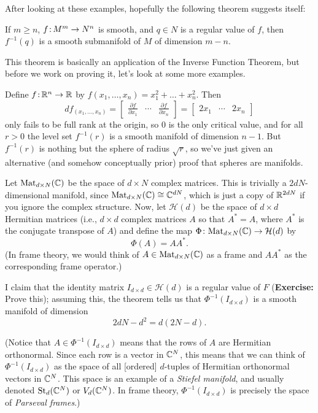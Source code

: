 	After looking at these examples, hopefully the following theorem suggests itself:
	
	\begin{theorem}\label{thm:level set theorem}
		If $m \geq n$, $f \colon\thinspace\!\! M^m \to N^n$ is smooth, and $q \in N$ is a regular value of $f$, then $f^{-1}(q)$ is a smooth submanifold of $M$ of dimension $m-n$.
	\end{theorem}
	
	This theorem is basically an application of the Inverse Function Theorem, but before we work on proving it, let's look at some more examples.
	
	\begin{example}
		Define $f \colon\thinspace\!\! \mathbb{R}^n \to \mathbb{R}$ by $f(x_1,\dots , x_n) = x_1^2 + \dots + x_n^2$. Then
		\[
			df_{(x_1, \dots , x_n)}= \begin{bmatrix} \frac{\partial f}{\partial x_1} & \cdots & \frac{\partial f}{\partial x_n} \end{bmatrix} = \begin{bmatrix} 2x_1 & \cdots & 2x_n \end{bmatrix}
		\]
		only fails to be full rank at the origin, so 0 is the only critical value, and for all $r > 0$ the level set $f^{-1}(r)$ is a smooth manifold of dimension $n-1$. But $f^{-1}(r)$ is nothing but the sphere of radius $\sqrt{r}$, so we've just given an alternative (and somehow conceptually prior) proof that spheres are manifolds.
	\end{example}
	
	\begin{example}
		Let $\operatorname{Mat}_{d \times N}(\mathbb{C})$ be the space of $d \times N$ complex matrices. This is trivially a $2dN$-dimensional manifold, since $\operatorname{Mat}_{d \times N} (\mathbb{C}) \cong \mathbb{C}^{dN}$, which is just a copy of $\mathbb{R}^{2dN}$ if you ignore the complex structure. Now, let $\mathcal{H}(d)$ be the space of $d \times d$ Hermitian matrices (i.e., $d \times d$ complex matrices $A$ so that $A^\ast = A$, where $A^\ast$ is the conjugate transpose of $A$) and define the map $\Phi\colon\thinspace\!\! \operatorname{Mat}_{d \times N}(\mathbb{C}) \to \mathcal{H}(d)$ by
		\[
			\Phi(A) = A A^\ast.
		\]
		(In frame theory, we would think of $A \in \operatorname{Mat}_{d \times N}(\mathbb{C})$ as a frame and $A A^\ast$ as the corresponding frame operator.)
		
		I claim that the identity matrix $I_{d \times d} \in \mathcal{H}(d)$ is a regular value of $F$ (\textbf{Exercise:} Prove this); assuming this, the theorem tells us that $\Phi^{-1}(I_{d \times d})$ is a smooth manifold of dimension
		\[
			2dN - d^2 = d(2N-d).
		\]
		
		(Notice that $A \in \Phi^{-1}(I_{d \times d})$ means that the rows of $A$ are Hermitian orthonormal. Since each row is a vector in $\mathbb{C}^N$, this means that we can think of $\Phi^{-1}(I_{d \times d})$ as the space of all [ordered] $d$-tuples of Hermitian orthonormal vectors in $\mathbb{C}^N$. This space is an example of a \emph{Stiefel manifold}, and usually denoted $\operatorname{St}_d(\mathbb{C}^N)$ or $V_d(\mathbb{C}^N)$. In frame theory, $\Phi^{-1}(I_{d \times d})$ is precisely the space of \emph{Parseval frames}.)
	\end{example}
	
